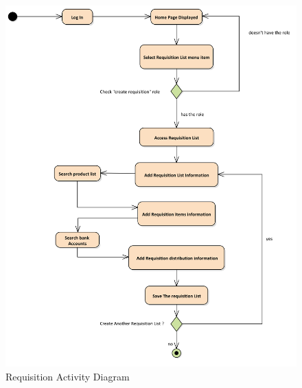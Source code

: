 \documentclass[12pt]{report} %
\begin{document}
\begin{figure}[h]
	\includegraphics[width=1\textwidth]{pic/Activity/requisition.png}
	\caption{Requisition Activity Diagram}
	\label{fig:requisition}
\end{figure}
\end{document}
